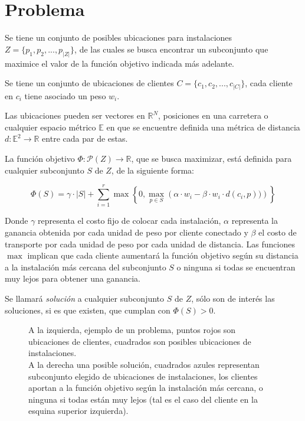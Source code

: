 \section{Problema}



Se tiene un conjunto de posibles ubicaciones para instalaciones $Z = \{p_1,p_2,...,p_{|Z|}\}$, de las cuales se busca encontrar un subconjunto que maximice el valor de la función objetivo indicada más adelante.

Se tiene un conjunto de ubicaciones de clientes $C = \{c_1,c_2,...,c_{|C|}\}$, cada cliente en $c_i$ tiene asociado un peso $w_i$.

Las ubicaciones pueden ser vectores en $\mathbb{R}^N$, posiciones en una carretera o cualquier espacio métrico $\mathbb{E}$ en que se encuentre definida una métrica de distancia $d : \mathbb{E}^2 \rightarrow \mathbb{R}$ entre cada par de estas.

La función objetivo $\Phi : \mathcal{P}(Z) \rightarrow \mathbb{R}$, que se busca maximizar, está definida para cualquier subconjunto $S$ de $Z$, de la siguiente forma:

\begin{equation}
\Phi(S) = \gamma \cdot |S| + \sum_{i=1}^r \max \left\{0 , \max_{p \in S} \left(
    \alpha \cdot w_i - \beta \cdot w_i \cdot d(c_i,p))
\right) \right\}
\end{equation}

Donde $\gamma$ representa el costo fijo de colocar cada instalación, $\alpha$ representa la ganancia obtenida por cada unidad de peso por cliente conectado y $\beta$ el costo de transporte por cada unidad de peso por cada unidad de distancia. Las funciones $\max$ implican que cada cliente aumentará la función objetivo según su distancia a la instalación más cercana del subconjunto $S$ o ninguna si todas se encuentran muy lejos para obtener una ganancia.

Se llamará \emph{solución} a cualquier subconjunto $S$ de $Z$, sólo son de interés las soluciones, si es que existen, que cumplan con $\Phi(S) > 0$.

\begin{figure}%
    \centering
    \qquad \qquad \qquad
    \caption{A la izquierda, ejemplo de un problema, puntos rojos son ubicaciones de clientes, cuadrados son posibles ubicaciones de instalaciones.\\A la derecha una posible solución, cuadrados azules representan subconjunto elegido de ubicaciones de instalaciones, los clientes aportan a la función objetivo según la instalación más cercana, o ninguna si todas están muy lejos (tal es el caso del cliente en la esquina superior izquierda).}
    \label{fig:algorithm}
\end{figure}


